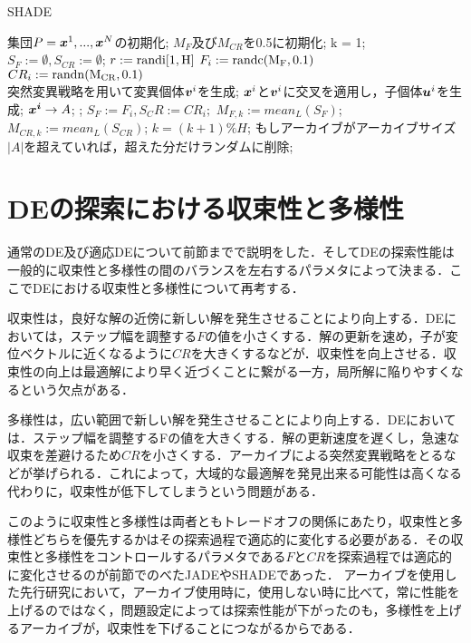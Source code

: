 \documentclass[a4paper,11pt,oneside,openany]{jsbook}
\def\vector#1{\mbox{\boldmath $#1$}}
\begin{document}
\newpage
\begin{algorithm}
\caption{SHADE}
\label{alg:pbnf}
\begin{algorithmic}
\STATE 集団$P={\vector{x}^1,...,\vector{x}^N}$の初期化;
\STATE $M _F$及び$M _{CR}$を0.5に初期化;
\STATE k = 1;
    \STATE $S_F := \emptyset, S_{CR} := \emptyset$;
        \STATE $r := \rm{randi}[1,H]$
        \STATE $F_i := \rm{randc}(M_F, 0.1)$ \\
        \STATE $CR_i := \rm{randn}(M_{CR}, 0.1)$ \\
        \STATE 突然変異戦略を用いて変異個体{$\vector{v}^i$}を生成;
        \STATE $\vector{x}^i$と$\vector{v}^i$に交叉を適用し，子個体$\vector{u}^i$を生成;
     \ENDFOR
        \IF {$f(\vector{u}^i) \leqq f(\vector{x}^i)$}
            \STATE $\vector{x^i} \rightarrow {A}$;
            \STATE {$\vector{x}^i=\vector{u}^i$};
            \STATE $S_F := {F_i}, S_CR := {CR_i};$
        \ENDIF
    \ENDFOR
        \STATE $M_{F,k}  :=  mean_L(S_F)$;
        \STATE $M_{CR,k}  :=  mean_L(S_{CR})$;
        \STATE $k = (k+1) \% H$;
    \ENDIF
    \STATE もしアーカイブがアーカイブサイズ$|A|$を超えていれば，超えた分だけランダムに削除;
\ENDWHILE
\end{algorithmic}
\end{algorithm}
\newpage
\section{DEの探索における収束性と多様性}
通常のDE及び適応DEについて前節までで説明をした．そしてDEの探索性能は一般的に収束性と多様性の間のバランスを左右するパラメタによって決まる．ここでDEにおける収束性と多様性について再考する．

収束性は，良好な解の近傍に新しい解を発生させることにより向上する．DEにおいては，ステップ幅を調整する$F$の値を小さくする．解の更新を速め，子が変位ベクトルに近くなるように$CR$を大きくするなどが．収束性を向上させる．収束性の向上は最適解により早く近づくことに繋がる一方，局所解に陥りやすくなるという欠点がある．

多様性は，広い範囲で新しい解を発生させることにより向上する．DEにおいては．ステップ幅を調整するFの値を大きくする．解の更新速度を遅くし，急速な収束を差避けるため$CR$を小さくする．アーカイブによる突然変異戦略をとるなどが挙げられる．これによって，大域的な最適解を発見出来る可能性は高くなる代わりに，収束性が低下してしまうという問題がある．

このように収束性と多様性は両者ともトレードオフの関係にあたり，収束性と多様性どちらを優先するかはその探索過程で適応的に変化する必要がある．その収束性と多様性をコントロールするパラメタである$F$と$CR$を探索過程では適応的に変化させるのが前節でのべたJADEやSHADEであった．
アーカイブを使用した先行研究において，アーカイブ使用時に，使用しない時に比べて，常に性能を上げるのではなく，問題設定によっては探索性能が下がったのも，多様性を上げるアーカイブが，収束性を下げることにつながるからである．
\end{document}
